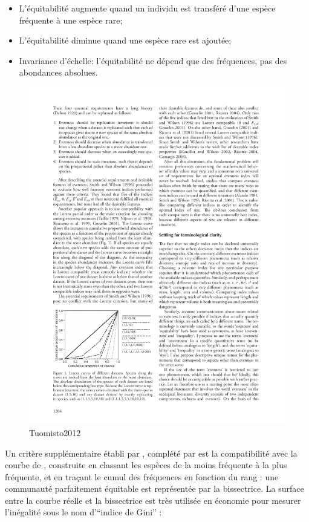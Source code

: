 \documentclass[
  11pt,
  french,
  a4paper,
  extrafontsizes,onecolumn,openright
  ]{memoir}
\providecommand{\tightlist}{%
  \setlength{\itemsep}{0pt}\setlength{\parskip}{0pt}}
\newlength{\rf}
\begin{document}
\begin{itemize}
\tightlist
\item
  L'équitabilité augmente quand un individu est transféré d'une espèce fréquente à une espèce rare;
\item
  L'équitabilité diminue quand une espèce rare est ajoutée;
\item
  Invariance d'échelle: l'équitabilité ne dépend que des fréquences, pas des abondances absolues.
\end{itemize}



\scriptsize

\begin{figure}

{\centering \includegraphics[width=0.8\linewidth]{images/Tuomisto2012} 

}

\caption{Tuomisto2012}\label{fig:Tuomisto2012}
\end{figure}

\normalsize

Un critère supplémentaire établi par \textcite{Smith1996}, complété par \textcite{Gosselin2001} est la compatibilité avec la courbe de \textcite{Lorenz1905}, construite en classant les espèces de la moins fréquente à la plus fréquente, et en traçant le cumul des fréquences en fonction du rang \autocite[figure \ref{fig:Tuomisto2012},][]{Tuomisto2012}: une communauté parfaitement équitable est représentée par la bissectrice.
La surface entre la courbe réelle et la bissectrice est très utilisée en économie pour mesurer l'inégalité sous le nom d'\enquote{indice de Gini} \autocite{Gini1912,Ceriani2012}:
\end{document}
